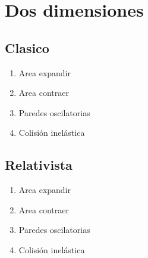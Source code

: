 \documentclass[11pt, spanish]{book}
\begin{document}
\section{Dos dimensiones}

\subsection{Clasico}
\begin{enumerate}
    \item Area expandir
    \item Area contraer
    \item Paredes oscilatorias
    \item Colisión inelástica
\end{enumerate}
\subsection{Relativista}
\begin{enumerate}
    \item Area expandir
    \item Area contraer
    \item Paredes oscilatorias
    \item Colisión inelástica
\end{enumerate}
\end{document}
